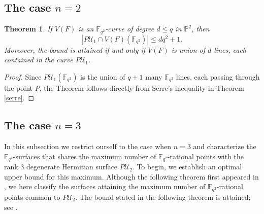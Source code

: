 \documentclass[10pt,a4paper,oneside]{amsproc}
\newtheorem{theorem}{Theorem}[section]
\newcommand{\Fqt}{\mathbb{F}_{q^2}}
\newcommand{\U}{\mathcal{U}}
\def\PP{{\mathbb P}}
\begin{document}
\subsection{The case $n=2$}\label{n=2}
\begin{theorem}\label{2-main-theorem}
 If $V(F)$ is an $\Fqt$-curve of degree $d\leq q$ in $\PP^2$, then $$|P\U_1\cap V(F)(\Fqt)|\leq dq^2+1.$$ Moreover, the bound is attained if and only if $V(F)$ is union of $d$ lines, each contained in the curve $P\U_1$. 
\end{theorem}
\begin{proof}
    Since $P\U_1(\Fqt)$ is the union of $q+1$ many $\Fqt$ lines, each passing through the point $P$, the Theorem follows directly from Serre's inequality in Theorem \ref{serre}.
\end{proof}

\subsection{The case $n=3$}\label{n=3}In this subsection we restrict ourself to the case when $n=3$ and characterize the $\Fqt$-surfaces that shares the maximum number of $\Fqt$-rational points with the rank $3$ degenerate Hermitian surface $P\U_2$. To begin, we establish an optimal upper bound for this maximum. Although the following theorem first appeared in \cite[Theorem 3.3]{DM}, we here classify the surfaces attaining the maximum number of $\Fqt$-rational points common to $P\U_2$. The bound stated in the following theorem is attained; see \cite[Remark 3.4]{DM}.
\end{document}
